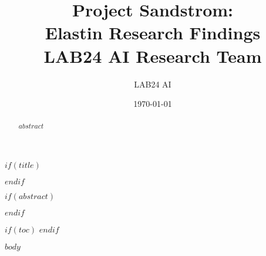 \documentclass[11pt,a4paper]{article}
\title{
    {\Huge\textbf{Project Sandstrom:}}\\[0.5em]
    {\Huge\textbf{Elastin Research Findings}}\\[1em]
    {\Large LAB24 AI Research Team}
}
\author{LAB24 AI}
\date{\today}
\begin{document}
$if(title)$
\maketitle
$endif$

$if(abstract)$
\begin{abstract}
$abstract$
\end{abstract}
$endif$

$if(toc)$
\newpage
\tableofcontents
\newpage
$endif$

$body$
\end{document}
